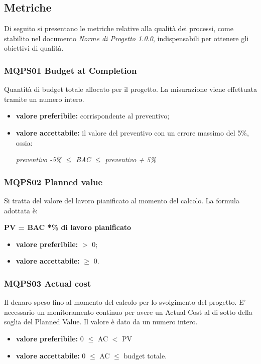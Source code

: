 \subsection{Metriche}\label{2.1.3}
Di seguito si presentano le metriche relative alla qualità dei processi, come stabilito nel
documento \textit{Norme di Progetto 1.0.0}, indispensabili per ottenere gli obiettivi di qualità.

\subsubsection{MQPS01 Budget at Completion}\label{2.1.3.1}
Quantità di budget totale allocato per il progetto.
La misurazione viene effettuata tramite un numero intero.
\begin{itemize}
	\item \textbf{valore preferibile:} corrispondente al preventivo;
	\item \textbf{valore accettabile:} il valore del preventivo con un errore massimo del 5\%, ossia:
	\begin{center}
		\textit{preventivo -5\% $\leq$ BAC $\leq$ preventivo + 5\%}
	\end{center}
\end{itemize}

\subsubsection{MQPS02 Planned value}\label{2.1.3.2}
Si tratta del valore del lavoro pianificato al momento del calcolo.
La formula adottata è:
\begin{center}
	\textbf{PV = BAC *\% di lavoro pianificato}
\end{center}
\begin{itemize}
	\item \textbf{valore preferibile:} $>$ 0;
	\item \textbf{valore accettabile:} $\geq$ 0.
\end{itemize}

\subsubsection{MQPS03 Actual cost}\label{2.1.3.3}
Il denaro speso fino al momento del calcolo per lo svolgimento del progetto.
E’ necessario un monitoramento continuo per avere un Actual Cost al di sotto della soglia del Planned Value. 
Il valore è dato da un numero intero.
\begin{itemize}
	\item \textbf{valore preferibile:} 0 $\leq$ AC $<$ PV
	\item \textbf{valore accettabile:}  0 $\leq$ AC $\leq$  budget totale.
\end{itemize}

